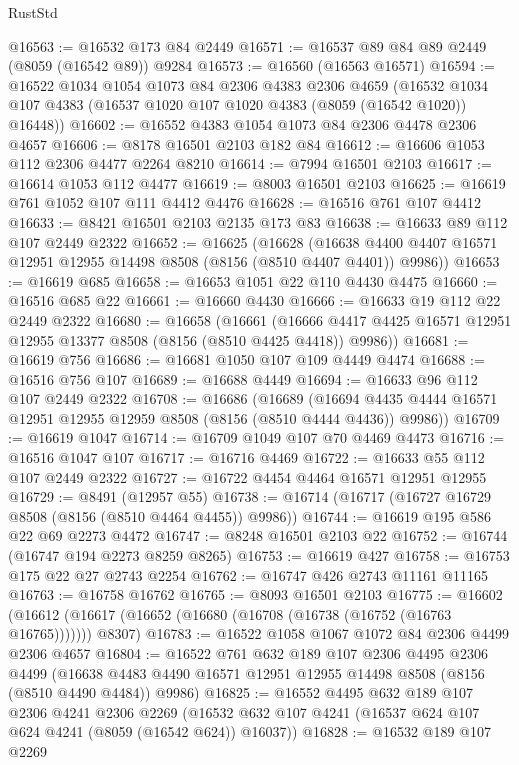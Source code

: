 \begin{lexlean}{RustStd}
\begin{coremodule}
{\begin{coremodule}
{{{{{{{{{{{{{{{{{{{{{{{{{{{{{{{{{{@16563 := @16532 @173 @84 @2449
@16571 := @16537 @89 @84 @89 @2449 (@8059 (@16542 @89)) @9284
@16573 := @16560 (@16563 @16571)
@16594 := @16522
    @1034
    @1054
    @1073
    @84
    @2306
    @4383
    @2306
    @4659
    (@16532 @1034 @107 @4383 (@16537 @1020 @107 @1020 @4383 (@8059 (@16542 @1020)) @16448))
@16602 := @16552 @4383 @1054 @1073 @84 @2306 @4478 @2306 @4657
@16606 := @8178 @16501 @2103 @182 @84
@16612 := @16606 @1053 @112 @2306 @4477 @2264 @8210
@16614 := @7994 @16501 @2103
@16617 := @16614 @1053 @112 @4477
@16619 := @8003 @16501 @2103
@16625 := @16619 @761 @1052 @107 @111 @4412 @4476
@16628 := @16516 @761 @107 @4412
@16633 := @8421 @16501 @2103 @2135 @173 @83
@16638 := @16633 @89 @112 @107 @2449 @2322
@16652 := @16625
    (@16628
      (@16638 @4400 @4407 @16571 @12951 @12955 @14498 @8508 (@8156 (@8510 @4407 @4401)) @9986))
@16653 := @16619 @685
@16658 := @16653 @1051 @22 @110 @4430 @4475
@16660 := @16516 @685 @22
@16661 := @16660 @4430
@16666 := @16633 @19 @112 @22 @2449 @2322
@16680 := @16658
    (@16661
      (@16666 @4417 @4425 @16571 @12951 @12955 @13377 @8508 (@8156 (@8510 @4425 @4418)) @9986))
@16681 := @16619 @756
@16686 := @16681 @1050 @107 @109 @4449 @4474
@16688 := @16516 @756 @107
@16689 := @16688 @4449
@16694 := @16633 @96 @112 @107 @2449 @2322
@16708 := @16686
    (@16689
      (@16694 @4435 @4444 @16571 @12951 @12955 @12959 @8508 (@8156 (@8510 @4444 @4436)) @9986))
@16709 := @16619 @1047
@16714 := @16709 @1049 @107 @70 @4469 @4473
@16716 := @16516 @1047 @107
@16717 := @16716 @4469
@16722 := @16633 @55 @112 @107 @2449 @2322
@16727 := @16722 @4454 @4464 @16571 @12951 @12955
@16729 := @8491 (@12957 @55)
@16738 := @16714 (@16717 (@16727 @16729 @8508 (@8156 (@8510 @4464 @4455)) @9986))
@16744 := @16619 @195 @586 @22 @69 @2273 @4472
@16747 := @8248 @16501 @2103 @22
@16752 := @16744 (@16747 @194 @2273 @8259 @8265)
@16753 := @16619 @427
@16758 := @16753 @175 @22 @27 @2743 @2254
@16762 := @16747 @426 @2743 @11161 @11165
@16763 := @16758 @16762
@16765 := @8093 @16501 @2103
@16775 := @16602
    (@16612 (@16617 (@16652 (@16680 (@16708 (@16738 (@16752 (@16763 @16765))))))) @8307)
@16783 := @16522 @1058 @1067 @1072 @84 @2306 @4499 @2306 @4657
@16804 := @16522
    @761
    @632
    @189
    @107
    @2306
    @4495
    @2306
    @4499
    (@16638 @4483 @4490 @16571 @12951 @12955 @14498 @8508 (@8156 (@8510 @4490 @4484)) @9986)
@16825 := @16552
    @4495
    @632
    @189
    @107
    @2306
    @4241
    @2306
    @2269
    (@16532 @632 @107 @4241 (@16537 @624 @107 @624 @4241 (@8059 (@16542 @624)) @16037))
@16828 := @16532 @189 @107 @2269
}}}}}}}}}}}}}}}}}}}}}}}}}}}}}}}}}}
\end{coremodule}}
\end{coremodule}
\end{lexlean}
